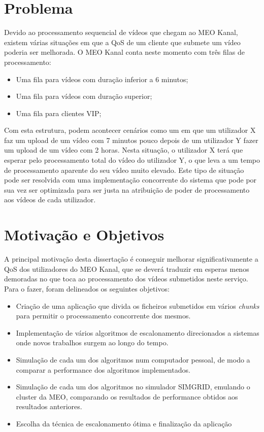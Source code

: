 \section{Problema}
Devido ao processamento sequencial de vídeos que chegam ao MEO Kanal, existem várias situações em que a QoS de um cliente que submete um vídeo poderia ser melhorada.
O MEO Kanal conta neste momento com três filas de processamento:
\begin{itemize}
	\item Uma fila para vídeos com duração inferior a 6 minutos;
	\item Uma fila para vídeos com duração superior;
	\item Uma fila para clientes VIP;
\end{itemize}
Com esta estrutura, podem acontecer cenários como um em que um utilizador X faz um upload de um vídeo com 7 minutos pouco depois de um utilizador Y fazer um upload de um vídeo com 2 horas. Nesta situação, o utilizador X terá que esperar pelo processamento total do vídeo do utilizador Y, o que leva a um tempo de processamento aparente do seu vídeo muito elevado. Este tipo de situação pode ser resolvida com uma implementação concorrente do sistema que pode por sua vez ser optimizada para ser justa na atribuição de poder de processamento aos vídeos de cada utilizador.

\section{Motivação e Objetivos} \label{sec:goals}
A principal motivação desta dissertação é conseguir melhorar significativamente a QoS dos utilizadores do MEO Kanal, que se deverá traduzir em esperas menos demoradas no que toca ao processamento dos vídeos submetidos neste serviço.
Para o fazer, foram delineados os seguintes objetivos:
\begin{itemize}
	\item Criação de uma aplicação que divida os ficheiros submetidos em vários \textit{chunks} para permitir o processamento concorrente dos mesmos.
	\item Implementação de vários algoritmos de escalonamento direcionados a sistemas onde novos trabalhos surgem ao longo do tempo.
	\item Simulação de cada um dos algoritmos num computador pessoal, de modo a comparar a performance dos algoritmos implementados.
	\item Simulação de cada um dos algoritmos no simulador SIMGRID, emulando o cluster da MEO, comparando os resultados de performance obtidos aos resultados anteriores.
	\item Escolha da técnica de escalonamento ótima e finalização da aplicação
\end{itemize}


